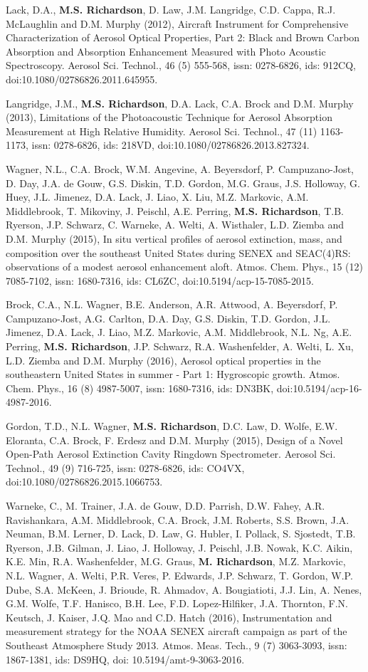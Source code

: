 \documentclass[margin,line]{res}
\begin{document}
\begin{resume}
Lack, D.A., {\bf M.S. Richardson}, D. Law, J.M. Langridge, C.D. Cappa, R.J. McLaughlin and D.M. Murphy (2012), Aircraft Instrument for Comprehensive Characterization of Aerosol Optical Properties, Part 2: Black and Brown Carbon Absorption and Absorption Enhancement Measured with Photo Acoustic Spectroscopy. Aerosol Sci. Technol., 46 (5) 555-568, issn: 0278-6826, ids: 912CQ, doi:10.1080/02786826.2011.645955.

Langridge, J.M., {\bf M.S. Richardson}, D.A. Lack, C.A. Brock and D.M. Murphy (2013), Limitations of the Photoacoustic Technique for Aerosol Absorption Measurement at High Relative Humidity. Aerosol Sci. Technol., 47 (11) 1163-1173, issn: 0278-6826, ids: 218VD, doi:10.1080/02786826.2013.827324.

Wagner, N.L., C.A. Brock, W.M. Angevine, A. Beyersdorf, P. Campuzano-Jost, D. Day, J.A. de Gouw, G.S. Diskin, T.D. Gordon, M.G. Graus, J.S. Holloway, G. Huey, J.L. Jimenez, D.A. Lack, J. Liao, X. Liu, M.Z. Markovic, A.M. Middlebrook, T. Mikoviny, J. Peischl, A.E. Perring, {\bf M.S. Richardson}, T.B. Ryerson, J.P. Schwarz, C. Warneke, A. Welti, A. Wisthaler, L.D. Ziemba and D.M. Murphy (2015), In situ vertical profiles of aerosol extinction, mass, and composition over the southeast United States during SENEX and SEAC(4)RS: observations of a modest aerosol enhancement aloft. Atmos. Chem. Phys., 15 (12) 7085-7102, issn: 1680-7316, ids: CL6ZC, doi:10.5194/acp-15-7085-2015.

Brock, C.A., N.L. Wagner, B.E. Anderson, A.R. Attwood, A. Beyersdorf, P. Campuzano-Jost, A.G. Carlton, D.A. Day, G.S. Diskin, T.D. Gordon, J.L. Jimenez, D.A. Lack, J. Liao, M.Z. Markovic, A.M. Middlebrook, N.L. Ng, A.E. Perring, {\bf M.S. Richardson}, J.P. Schwarz, R.A. Washenfelder, A. Welti, L. Xu, L.D. Ziemba and D.M. Murphy (2016), Aerosol optical properties in the southeastern United States in summer - Part 1: Hygroscopic growth. Atmos. Chem. Phys., 16 (8) 4987-5007, issn: 1680-7316, ids: DN3BK, doi:10.5194/acp-16-4987-2016.

Gordon, T.D., N.L. Wagner, {\bf M.S. Richardson}, D.C. Law, D. Wolfe, E.W. Eloranta, C.A. Brock, F. Erdesz and D.M. Murphy (2015), Design of a Novel Open-Path Aerosol Extinction Cavity Ringdown Spectrometer. Aerosol Sci. Technol., 49 (9) 716-725, issn: 0278-6826, ids: CO4VX, doi:10.1080/02786826.2015.1066753.

Warneke, C., M. Trainer, J.A. de Gouw, D.D. Parrish, D.W. Fahey, A.R. Ravishankara, A.M. Middlebrook, C.A. Brock, J.M. Roberts, S.S. Brown, J.A. Neuman, B.M. Lerner, D. Lack, D. Law, G. Hubler, I. Pollack, S. Sjostedt, T.B. Ryerson, J.B. Gilman, J. Liao, J. Holloway, J. Peischl, J.B. Nowak, K.C. Aikin, K.E. Min, R.A. Washenfelder, M.G. Graus, {\bf M. Richardson}, M.Z. Markovic, N.L. Wagner, A. Welti, P.R. Veres, P. Edwards, J.P. Schwarz, T. Gordon, W.P. Dube, S.A. McKeen, J. Brioude, R. Ahmadov, A. Bougiatioti, J.J. Lin, A. Nenes, G.M. Wolfe, T.F. Hanisco, B.H. Lee, F.D. Lopez-Hilfiker, J.A. Thornton, F.N. Keutsch, J. Kaiser, J.Q. Mao and C.D. Hatch (2016), Instrumentation and measurement strategy for the NOAA SENEX aircraft campaign as part of the Southeast Atmosphere Study 2013. Atmos. Meas. Tech., 9 (7) 3063-3093, issn: 1867-1381, ids: DS9HQ, doi: 10.5194/amt-9-3063-2016.
\end{resume}
\end{document}
